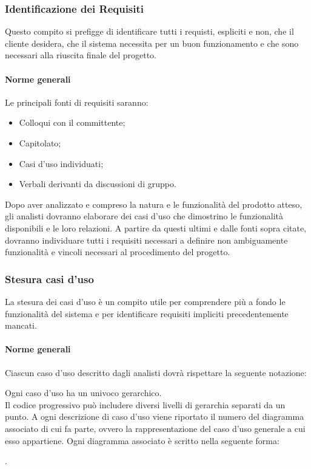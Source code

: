 \subsubsection{Identificazione dei Requisiti}
Questo compito si prefigge di identificare tutti i requisti, espliciti e non, che il cliente desidera, che il sistema necessita per un buon funzionamento e che sono necessari alla riuscita finale del progetto.

\paragraph{Norme generali}
Le principali fonti di requisiti saranno:
\begin{itemize}
\item Colloqui con il committente;
\item Capitolato;
\item Casi d'uso individuati;
\item Verbali derivanti da discussioni di gruppo.
\end{itemize}
Dopo aver analizzato e compreso la natura e le funzionalità del prodotto atteso, gli analisti dovranno elaborare dei casi d'uso che dimostrino le funzionalità disponibili e le loro relazioni.
A partire da questi ultimi e dalle fonti sopra citate, dovranno individuare tutti i requisiti necessari a definire non ambiguamente funzionalità e vincoli necessari al procedimento del progetto.


\subsubsection{Stesura casi d'uso}
La stesura dei casi d'uso è un compito utile per comprendere più a fondo le funzionalità del sistema e per identificare requisiti impliciti precedentemente mancati.

\paragraph{Norme generali}

Ciascun caso d'uso descritto dagli analisti dovrà rispettare la seguente notazione:
\begin{center}
\end{center}
Ogni caso d'uso ha un  univoco gerarchico.\\
Il codice progressivo può includere diversi livelli di gerarchia separati da un punto.
A ogni descrizione di caso d'uso viene riportato il numero del diagramma associato di cui fa parte, ovvero la rappresentazione del caso d'uso generale a cui esso appartiene.
Ogni diagramma associato è scritto nella seguente forma:
\begin{center}
.
\end{center}

